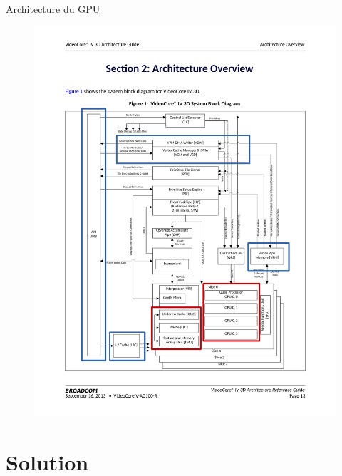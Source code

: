 \documentclass{bredelebeamer}
\begin{document}

\begin{frame}{Architecture du GPU}

\begin{figure}
\centering
\includegraphics[scale=0.2]{images/archOverview.pdf}
\end{figure}

\end{frame}



\section{Solution}

\end{document}

